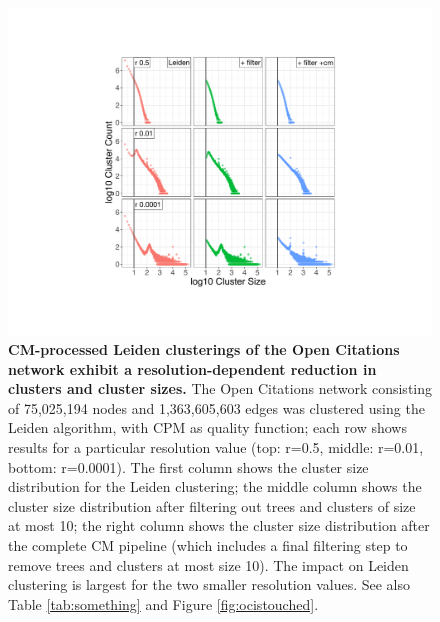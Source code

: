 \documentclass[11pt]{article}   	%
\begin{document}
\begin{figure}[H]
\centering
\includegraphics[width=\linewidth]{figs/fig1_kn.pdf}
\caption{\textbf{CM-processed Leiden clusterings of the Open Citations network exhibit a resolution-dependent reduction in clusters and cluster sizes.}
The Open Citations network consisting of 75,025,194 nodes and 1,363,605,603 edges was clustered using the Leiden algorithm,
with CPM as quality function; each row shows results for a particular resolution value (top: r=0.5, middle: r=0.01, bottom: r=0.0001).
The first column shows the cluster size distribution for the Leiden clustering; the middle column shows the cluster size distribution after filtering out trees and clusters of size at most 10; the right column shows the cluster size distribution after the complete CM pipeline (which includes a final filtering step to remove trees and clusters at most size 10).
The impact on Leiden clustering is largest for the two smaller resolution values.
See also   Table \ref{tab:something} and Figure \ref{fig:ocistouched}.}
\label{fig:oc_size_count_plots_leiden}
\end{figure}
\end{document}
